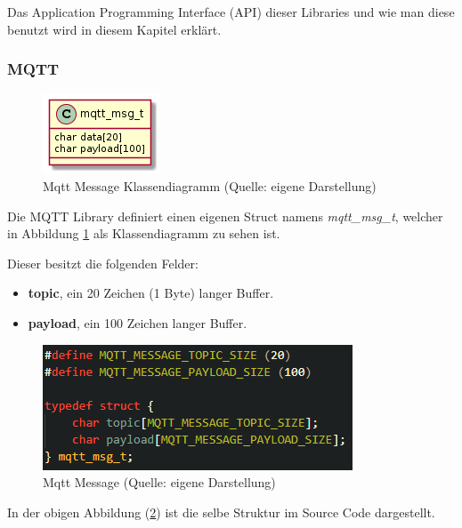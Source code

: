 Das Application Programming Interface (API) dieser Libraries und wie man diese benutzt wird in diesem Kapitel erklärt.

\subsubsection{MQTT}\label{sec:own-libraries-mqtt}

\begin{figure}[H]
    \begin{center}
        \includegraphics[scale=1]{diagrams/mqtt_msg_t.png}
        \caption{Mqtt Message Klassendiagramm (Quelle: eigene Darstellung)}
        \label{abb:mqtt_msg_t_diagram}
    \end{center}    
\end{figure}

Die MQTT Library definiert einen eigenen Struct namens \textit{mqtt\_msg\_t}, welcher in Abbildung \ref{abb:mqtt_msg_t_diagram} als Klassendiagramm zu sehen ist.

Dieser besitzt die folgenden Felder:

\begin{itemize}
    \item \textbf{topic}, ein 20 Zeichen (1 Byte) langer Buffer.
    \item \textbf{payload}, ein 100 Zeichen langer Buffer.
\end{itemize}

\begin{figure}[H]
    \begin{center}
        \includegraphics[scale=1]{images/mqtt_msg_t.png}
        \caption{Mqtt Message (Quelle: eigene Darstellung)}
        \label{abb:mqtt_msg_t}
    \end{center}
\end{figure}

In der obigen Abbildung (\ref{abb:mqtt_msg_t}) ist die selbe Struktur im Source Code dargestellt.

